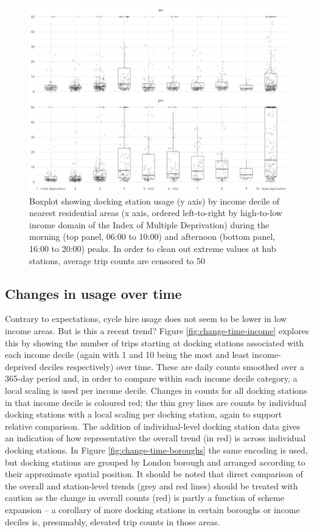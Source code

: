\documentclass[
]{article}
\begin{document}
\begin{figure}

{\centering \includegraphics[width=0.7\linewidth]{figures/income-decile-am-pm-boxplot_minor} 

}

\caption{Boxplot showing docking station usage (y axis) by income decile of nearest residential areas (x axis, ordered left-to-right by high-to-low income domain of the Index of Multiple Deprivation) during the morning (top panel, 06:00 to 10:00) and afternoon (bottom panel, 16:00 to 20:00) peaks. In order to clean out extreme values at hub stations, average trip counts are censored to 50}\label{fig:income-decile-am-pm-beeswarm}
\end{figure}

\hypertarget{changes-in-usage-over-time}{%
\subsection{Changes in usage over time}\label{changes-in-usage-over-time}}

Contrary to expectations, cycle hire usage does not seem to be lower in low income areas.
But is this a recent trend?
Figure \ref{fig:change-time-income} explores this by showing the number of trips starting at docking stations associated with each income decile (again with 1 and 10 being the most and least income-deprived deciles respectively) over time.
These are daily counts smoothed over a 365-day period and, in order to compare within each income decile category, a local scaling is used per income decile.
Changes in counts for all docking stations in that income decile is coloured red; the thin grey lines are counts by individual docking stations with a local scaling per docking station, again to support relative comparison.
The addition of individual-level docking station data gives an indication of how representative the overall trend (in red) is across individual docking stations. In Figure \ref{fig:change-time-boroughs} the same encoding is used, but docking stations are grouped by London borough and arranged according to their approximate spatial position. It should be noted that direct comparison of the overall and station-level trends (grey and red lines) should be treated with caution as the change in overall counts (red) is partly a function of scheme expansion -- a corollary of more docking stations in certain boroughs or income deciles is, presumably, elevated trip counts in those areas.
\end{document}
